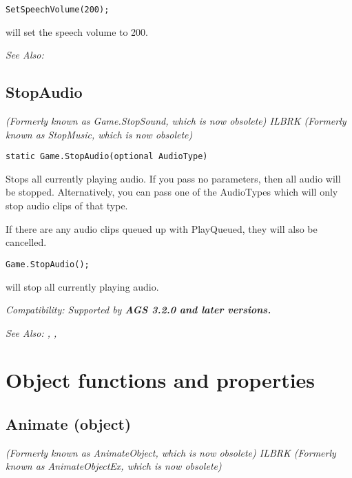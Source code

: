 \begin{verbatim}
SetSpeechVolume(200);
\end{verbatim}
will set the speech volume to 200.

\it{See Also:} 


\subsection{StopAudio}\label{Game.StopAudio}%

\it{(Formerly known as Game.StopSound, which is now obsolete)} ILBRK
\it{(Formerly known as StopMusic, which is now obsolete)}

\begin{verbatim}
static Game.StopAudio(optional AudioType)
\end{verbatim}
Stops all currently playing audio. If you pass no parameters, then all audio will be stopped.
Alternatively, you can pass one of the AudioTypes which will only stop audio clips of that
type.

If there are any audio clips queued up with PlayQueued, they will also be cancelled.

\begin{verbatim}
Game.StopAudio();
\end{verbatim}
will stop all currently playing audio.

\it{Compatibility:} Supported by \bf{AGS 3.2.0} and later versions.

\it{See Also:} , ,


\section{Object functions and properties}%


\subsection{Animate (object)}\label{Object.Animate}%

\it{(Formerly known as AnimateObject, which is now obsolete)} ILBRK
\it{(Formerly known as AnimateObjectEx, which is now obsolete)}

